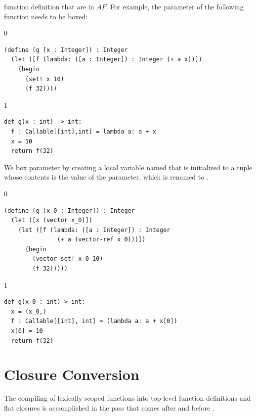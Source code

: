 \documentclass[7x10]{TimesAPriori_MIT}%
\def\racketEd{0}
\def\pythonEd{1}
\def\edition{1}
\newcommand{\pythonColor}[0]{}
\numberwithin{theorem}{chapter}
\numberwithin{definition}{chapter}
\numberwithin{equation}{chapter}
\begin{document}
function definition that are in $\mathit{AF}$. For example,
the parameter  of the following function 
needs to be boxed:
{\if\edition\racketEd
\begin{lstlisting}
(define (g [x : Integer]) : Integer
  (let ([f (lambda: ([a : Integer]) : Integer (+ a x))])
    (begin
      (set! x 10)
      (f 32))))
\end{lstlisting}
\fi}
%
{\if\edition\pythonEd\pythonColor
\begin{lstlisting}
def g(x : int) -> int:
  f : Callable[[int],int] = lambda a: a + x
  x = 10
  return f(32)
\end{lstlisting}
\fi}
%
\noindent We box parameter  by creating a local variable named
 that is initialized to a tuple whose contents is the value of
the parameter, which is renamed to .
%
{\if\edition\racketEd
\begin{lstlisting}
(define (g [x_0 : Integer]) : Integer
  (let ([x (vector x_0)])
    (let ([f (lambda: ([a : Integer]) : Integer
               (+ a (vector-ref x 0)))])
      (begin 
        (vector-set! x 0 10)
        (f 32)))))
\end{lstlisting}
\fi}
%
{\if\edition\pythonEd\pythonColor
\begin{lstlisting}
def g(x_0 : int)-> int:
  x = (x_0,)
  f : Callable[[int], int] = (lambda a: a + x[0])
  x[0] = 10
  return f(32)
\end{lstlisting}
\fi}

\section{Closure Conversion}
\label{sec:closure-conversion}

The compiling of lexically scoped functions into top-level function
definitions and flat closures is accomplished in the pass
 that comes after 
and before .
\end{document}
